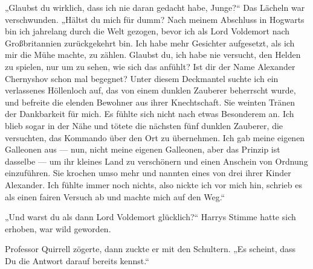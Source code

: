 „Glaubst du wirklich, dass ich nie daran gedacht habe, Junge?“
Das Lächeln war verschwunden.
„Hältst du mich für dumm? Nach meinem Abschluss in Hogwarts bin ich jahrelang durch die Welt gezogen, bevor ich als Lord Voldemort nach Großbritannien zurückgekehrt bin. Ich habe mehr Gesichter aufgesetzt, als ich mir die Mühe machte, zu zählen. Glaubst du, ich habe nie versucht, den Helden zu spielen, nur um zu sehen, wie sich das anfühlt? Ist dir der Name Alexander Chernyshov schon mal begegnet? Unter diesem Deckmantel suchte ich ein verlassenes Höllenloch auf, das von einem dunklen Zauberer beherrscht wurde, und befreite die elenden Bewohner aus ihrer Knechtschaft. Sie weinten Tränen der Dankbarkeit für mich. Es fühlte sich nicht nach etwas Besonderem an. Ich blieb sogar in der Nähe und tötete die nächsten fünf dunklen Zauberer, die versuchten, das Kommando über den Ort zu übernehmen. Ich gab meine eigenen Galleonen aus — nun, nicht meine eigenen Galleonen, aber das Prinzip ist dasselbe — um ihr kleines Land zu verschönern und einen Anschein von Ordnung einzuführen. Sie krochen umso mehr und nannten eines von drei ihrer Kinder Alexander. Ich fühlte immer noch nichts, also nickte ich vor mich hin, schrieb es als einen fairen Versuch ab und machte mich auf den Weg.“

„Und warst du als dann Lord Voldemort glücklich?“
Harrys Stimme hatte sich erhoben, war wild geworden.

Professor Quirrell zögerte, dann zuckte er mit den Schultern.
„Es scheint, dass Du die Antwort darauf bereits kennst.“

